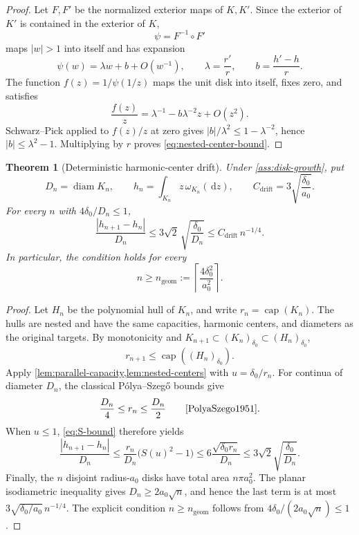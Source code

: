 \documentclass[11pt]{article}
\theoremstyle{mainthm}
\newtheorem{theorem}{Theorem}[section]
\theoremstyle{definition}
\theoremstyle{remark}
\newcommand{\dd}{\,\mathrm d}
\DeclareMathOperator{\caplog}{cap}
\begin{document}
\begin{proof}
Let $F,F'$ be the normalized exterior maps of $K,K'$. Since the exterior
of $K'$ is contained in the exterior of $K$,
\[
  \psi=F^{-1}\circ F'
\]
maps $|w|>1$ into itself and has expansion
\[
  \psi(w)=\lambda w+b+O(w^{-1}),
  \qquad
  \lambda=\frac{r'}{r},
  \qquad
  b=\frac{h'-h}{r}.
\]
The function $f(z)=1/\psi(1/z)$ maps the unit disk into itself, fixes zero,
and satisfies
\[
  \frac{f(z)}{z}=\lambda^{-1}-b\lambda^{-2}z+O(z^2).
\]
Schwarz--Pick applied to $f(z)/z$ at zero gives
$|b|/\lambda^2\le1-\lambda^{-2}$, hence
$|b|\le\lambda^2-1$. Multiplying by $r$ proves
\eqref{eq:nested-center-bound}.
\end{proof}

\begin{theorem}[Deterministic harmonic-center drift]
\label{thm:center-drift}
Under \cref{ass:disk-growth}, put
\[
  D_n=\operatorname{diam}K_n,
  \qquad
  h_n=\int_{K_n}z\,\omega_{K_n}(\dd z),
  \qquad
  C_{\mathrm{drift}}=3\sqrt{\frac{\delta_0}{a_0}}.
\]
For every $n$ with $4\delta_0/D_n\le1$,
\begin{equation}
\boxed{
  \frac{|h_{n+1}-h_n|}{D_n}
  \le 3\sqrt{2}\,\sqrt{\frac{\delta_0}{D_n}}
  \le C_{\mathrm{drift}}\,n^{-1/4}.
}
\label{eq:center-drift}
\end{equation}
In particular, the condition holds for every
\begin{equation}
  n\ge n_{\mathrm{geom}}
  :=\left\lceil\frac{4\delta_0^2}{a_0^2}\right\rceil.
  \label{eq:n-geom}
\end{equation}
\end{theorem}

\begin{proof}
Let $H_n$ be the polynomial hull of $K_n$, and write $r_n=\caplog(K_n)$.
The hulls are nested and have the same capacities, harmonic centers, and
diameters as the original targets. By monotonicity and
$K_{n+1}\subset(K_n)_{\delta_0}\subset(H_n)_{\delta_0}$,
\[
  r_{n+1}\le\caplog((H_n)_{\delta_0}).
\]
Apply \cref{lem:parallel-capacity,lem:nested-centers} with
$u=\delta_0/r_n$. For continua of diameter $D_n$, the classical
P\'olya--Szeg\H{o} bounds give
\[
  \frac{D_n}{4}\le r_n\le\frac{D_n}{2}
  \qquad\text{\cite{PolyaSzego1951}}.
\]
When $u\le1$, \eqref{eq:S-bound} therefore yields
\[
  \frac{|h_{n+1}-h_n|}{D_n}
  \le\frac{r_n}{D_n}\bigl(S(u)^2-1\bigr)
  \le 6\frac{\sqrt{\delta_0r_n}}{D_n}
  \le3\sqrt{2}\sqrt{\frac{\delta_0}{D_n}}.
\]
Finally, the $n$ disjoint radius-$a_0$ disks have total area
$n\pi a_0^2$. The planar isodiametric inequality gives
$D_n\ge2a_0\sqrt n$, and hence the last term is at most
$3\sqrt{\delta_0/a_0}\,n^{-1/4}$. The explicit condition
$n\ge n_{\mathrm{geom}}$ follows from
$4\delta_0/(2a_0\sqrt n)\le1$.
\end{proof}
\end{document}
